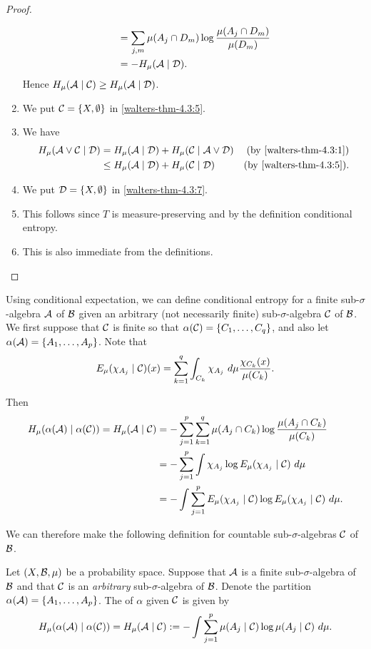 \begin{theorem}
\begin{proof}
\begin{enumerate}
\begin{align*}
						&= \sum_{j, m}{\mu(A_j \cap D_m) \log{\frac{\mu(A_j \cap D_m)}{\mu(D_m)}}} \\
						&= -H_\mu(\mathcal{A} \mid \mathcal{D}).
				\end{align*}
				Hence $H_\mu(\mathcal{A} \mid \mathcal{C}) \geq H_\mu(\mathcal{A} \mid \mathcal{D})$.
			\item We put $\mathcal{C} = \{X, \emptyset\}$ in \ref{walters-thm-4.3:5}.
			\item We have
				\begin{align*}
					H_\mu(\mathcal{A} \vee \mathcal{C} \mid \mathcal{D}) &= H_\mu(\mathcal{A} \mid \mathcal{D}) + H_\mu(\mathcal{C} \mid \mathcal{A} \vee \mathcal{D}) & \text{(by \ref{walters-thm-4.3:1})} \\
						&\leq H_\mu(\mathcal{A} \mid \mathcal{D}) + H_\mu(\mathcal{C} \mid \mathcal{D}) & \text{(by \ref{walters-thm-4.3:5})}.
				\end{align*}
			\item We put $\mathcal{D} = \{X, \emptyset\}$ in \ref{walters-thm-4.3:7}.
			\item This follows since $T$ is measure-preserving and by the definition conditional entropy.
			\item This is also immediate from the definitions.
		\end{enumerate}
	\end{proof}
\end{theorem}

Using conditional expectation, we can define conditional entropy for a finite sub-$\sigma$-algebra $\mathcal{A}$ of $\mathcal{B}$ given an arbitrary (not necessarily finite) sub-$\sigma$-algebra $\mathcal{C}$ of $\mathcal{B}$. We first suppose that $\mathcal{C}$ is finite so that $\alpha(\mathcal{C}) = \{C_1, \dots, C_q\}$, and also let $\alpha(\mathcal{A}) = \{A_1, \dots, A_p\}$. Note that
\[
		E_\mu(\chi_{A_j} \mid \C)(x) = \sum_{k = 1}^{q}{\int_{C_k}{\chi_{A_j}\ d\mu}\frac{\chi_{C_k}(x)}{\mu(C_k)}}.
\]

Then
\begin{align*}
	H_\mu(\alpha(\mathcal{A}) \mid \alpha(\mathcal{C})) = H_\mu(\mathcal{A} \mid \mathcal{C}) &= -\sum_{j = 1}^{p}{\sum_{k = 1}^{q}{\mu(A_j \cap C_k) \log{\frac{\mu(A_j \cap C_k)}{\mu(C_k)}}}} \\
		&= -\sum_{j = 1}^{p}{\int{\chi_{A_j} \log{E_\mu(\chi_{A_j} \mid \mathcal{C})}\ d\mu}} \\
		&= -\int{\sum_{j = 1}^{p}{E_\mu(\chi_{A_j} \mid \mathcal{C}) \log{E_\mu(\chi_{A_j} \mid \mathcal{C})}}\ d\mu}.
\end{align*}

We can therefore make the following definition for countable sub-$\sigma$-algebras $\mathcal{C}$ of $\mathcal{B}$.

\begin{definition}
	Let $(X, \mathcal{B}, \mu)$ be a probability space. Suppose that $\mathcal{A}$ is a finite sub-$\sigma$-algebra of $\mathcal{B}$ and that $\mathcal{C}$ is an \emph{arbitrary} sub-$\sigma$-algebra of $\mathcal{B}$. Denote the partition $\alpha(\mathcal{A}) = \{A_1, \dots, A_p\}$. The  of $\alpha$ given $\mathcal{C}$ is given by
	\[
		H_\mu(\alpha(\A) \mid \alpha(\C)) = H_\mu(\A \mid \C) := -\int{\sum_{j = 1}^{p}{\mu(A_j \mid \C) \log{\mu(A_j \mid \C)}}\ d\mu}.
	\]
\end{definition}

